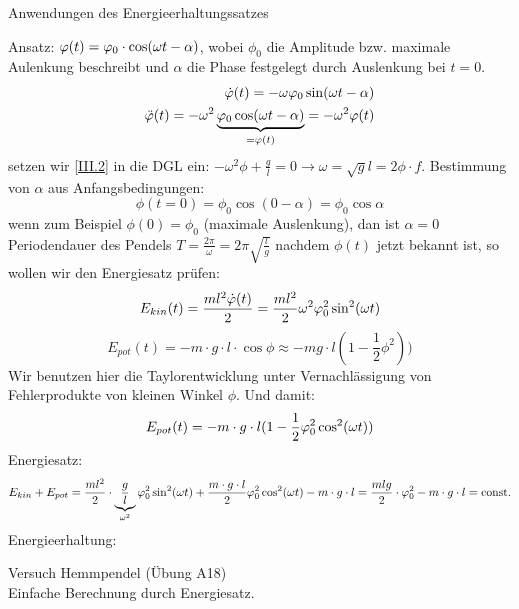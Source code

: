 \documentclass[a4paper,10pt]{scrartcl}
\begin{document}
\begin{seg}{Anwendungen des Energieerhaltungssatzes}
\begin{enumerate}[a)]
Ansatz: $\varphi(t)=\varphi_0\cdot \cos(\omega t-\alpha)$, wobei $\phi_0$ die Amplitude bzw. maximale Aulenkung beschreibt und $\alpha$ die Phase festgelegt durch Auslenkung bei $t=0$.
\begin{align}
 \dot {\varphi}(t)=-\omega\varphi_0\sin(\omega t - \alpha)\label{II.2}\\
 \ddot {\varphi}(t)=-\omega^2\underbrace{\varphi_0\cos(\omega t-\alpha)}_{=\varphi(t)}=-\omega^2\varphi(t)\label{III.2}
\end{align}
setzen wir \ref{III.2} in die DGL ein: $-\omega^2\phi+\frac{g}{l}=0\rightarrow \omega=\sqrt{g}{l}=2\phi\cdot f$.
Bestimmung von $\alpha$ aus Anfangsbedingungen:
\[
 \phi(t=0)=\phi_0\cos(0-\alpha)=\phi_0\cos\alpha
\]
wenn zum Beispiel $\phi(0)=\phi_0$ (maximale Auslenkung), dan ist $\alpha=0$ Periodendauer des Pendels $T=\frac{2\pi}{\omega}=2\pi\sqrt{\frac{l}{g}}$
nachdem $\phi(t)$ jetzt bekannt ist, so wollen wir den Energiesatz prüfen:
\[
 E_{kin}(t)=\frac{ml^2\dot {\varphi}(t)}2=\frac{ml^2}2 \omega^2 \varphi_0^2 \sin^2(\omega t)
\]
\[
 E_{pot}(t)=-m\cdot g\cdot l\cdot \cos{\phi}\approx-mg\cdot l(1-\frac{1}{2}\phi^2))
\]
Wir benutzen hier die Taylorentwicklung unter Vernachlässigung von Fehlerprodukte von kleinen Winkel $\phi$. Und damit:
\[
 E_{pot}(t)=-m\cdot g\cdot l(1-\frac 1 2 \varphi_0^2\cos^2(\omega t))
\]
Energiesatz:
\[
 E_{kin}+E_{pot}=\frac{ml^2}{2}\cdot \underbrace{\frac{g}{l}}_{\omega^2}\varphi_0^2 \sin^2(\omega t)+\frac{m\cdot g\cdot l}2 \varphi_0^2\cos^2(\omega t)-m\cdot g\cdot l=\frac{mlg}{2}\cdot \varphi_0^2-m\cdot g \cdot l = \text{const}.
\]
Energieerhaltung:\\
\begin{seg}{Versuch Hemmpendel (Übung A18)}
\\
Einfache Berechnung durch Energiesatz. \\
\end{seg}

\end{enumerate}
\end{seg}
\end{document}
